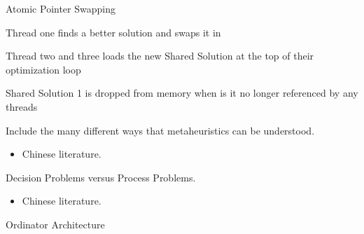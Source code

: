 \documentclass{beamer}
\begin{document}
\begin{frame}{}
    \begin{block}{Atomic Pointer Swapping}
		\drawAtomicPointerSwapping[onesolution=true]
    \end{block}
\end{frame}

\begin{frame}{}
    \begin{block}{Thread one finds a better solution and swaps it in}
		\drawAtomicPointerSwapping[twosolutions=true]
    \end{block}
\end{frame}

\begin{frame}{}
    \begin{block}{Thread two and three loads the new Shared Solution at the top of their optimization loop}
		\drawAtomicPointerSwapping[threesolutions=true]
    \end{block}
\end{frame}

\begin{frame}{}
    \begin{block}{Shared Solution 1 is dropped from memory when is it no longer referenced by any threads}
		\drawAtomicPointerSwapping[threesolutions=true]
    \end{block}
\end{frame}
\begin{frame}{}
    \begin{block}{Include the many different ways that metaheuristics can be
	understood.}
	\begin{itemize}
		\item Chinese literature.
	\end{itemize}
    \end{block}
\end{frame}
\begin{frame}{}
    \begin{block}{Decision Problems versus Process Problems.}
	\begin{itemize}
		\item Chinese literature.
	\end{itemize}
    \end{block}
\end{frame}
\begin{frame}{}
    \begin{block}{Ordinator Architecture}
		
    \end{block}
\end{frame}
\end{document}
